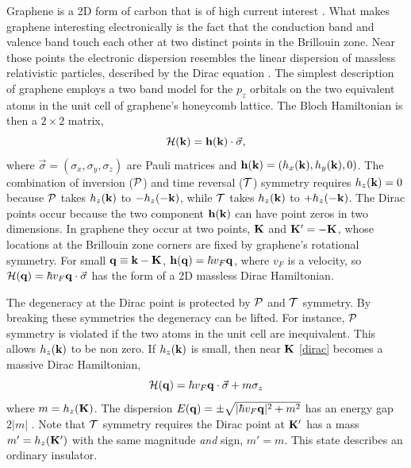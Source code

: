 \documentclass[twocolumn,floatfix,showpacs,rmp,aps]{revtex4}
\begin{document}
Graphene is a 2D form of carbon that is of high current interest
\cite{novoselov05, zhangy05, geim07,neto09}.  What makes graphene interesting
electronically is the fact that the conduction band and valence
band touch each other at two distinct points in the Brillouin zone.  Near
those points the electronic dispersion resembles the linear dispersion
of massless relativistic particles, described by the Dirac equation
\cite{divencenzo84,semenoff84}.
The simplest description of graphene employs a two band model for
the $p_z$ orbitals on the two equivalent atoms in the unit
cell of graphene's honeycomb lattice.  The Bloch Hamiltonian is
then a $2\times 2$ matrix,
\begin{equation}
{\cal H}({\bf k}) = {\bf h}({\bf k}) \cdot \vec \sigma,
\label{dirac}
\end{equation}
where $\vec\sigma = (\sigma_x,\sigma_y,\sigma_z)$ are Pauli matrices
and ${\bf h}({\bf k}) = (h_x({\bf k}),h_y({\bf k}),0)$.  The
combination of inversion ($\cal P$) and time reversal ($\cal T$) symmetry requires
$h_z({\bf k})=0$ because
$\cal P$ takes $h_z({\bf k})$ to $-h_z(-{\bf k})$, while $\cal T$ takes
$h_z({\bf k})$ to $+h_z(-{\bf k})$.  The Dirac points
occur because the two component ${\bf h}({\bf k})$ can have point
zeros in two dimensions.  In graphene they occur at two points,
${\bf K}$ and ${\bf K}'=-{\bf K}$, whose locations at the
Brillouin zone corners are fixed
by graphene's rotational symmetry.  For small ${\bf q} \equiv {\bf k}-{\bf K}$,
${\bf h}({\bf q}) = \hbar v_F {\bf q}$, where $v_F$ is a velocity,
so ${\cal H}({\bf q}) = \hbar v_F {\bf q}\cdot\vec\sigma$
has the form of a 2D massless Dirac Hamiltonian.

The degeneracy at the Dirac point is protected by $\cal P$ and $\cal T$ symmetry.
By breaking these symmetries the degeneracy
can be lifted.  For instance, $\cal P$ symmetry is violated if the
two atoms in the unit cell are inequivalent.  This allows
$h_z({\bf k})$ to be non zero.  If $h_z({\bf k})$ is small, then
near ${\bf K}$ \eqref{dirac} becomes a massive Dirac
Hamiltonian,
\begin{equation}
{\cal H}({\bf q}) = \hbar v_F{\bf q}\cdot\vec\sigma + m \sigma_z
\label{diracmass}
\end{equation}
where $m = h_z({\bf K})$.  The dispersion
$E({\bf q}) = \pm \sqrt{|\hbar v_F {\bf q}|^2+m^2}$ has an
energy gap $2|m|$ .  Note
that ${\cal T}$ symmetry requires the Dirac point at ${\bf K}'$ has
a mass $m'=h_z({\bf K}')$ with the same magnitude {\it and} sign, $m' = m$.  This state
describes an ordinary insulator.
\end{document}

